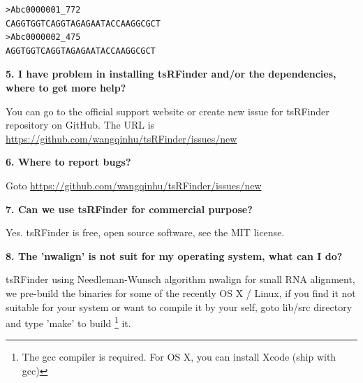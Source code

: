 \documentclass[11pt, a4paper]{article}
\begin{document}
{\tiny \begin{tcolorbox}[colback=blue!5!white,colframe=blue!75!black,title=sRNA example]
\begin{verbatim}
>Abc0000001_772
CAGGTGGTCAGGTAGAGAATACCAAGGCGCT
>Abc0000002_475
AGGTGGTCAGGTAGAGAATACCAAGGCGCT
\end{verbatim}
\end{tcolorbox}}


\textbf{5. I have problem in installing tsRFinder and/or the dependencies, where to get more help?}

You can go to the official support website or create new issue for tsRFinder repository on GitHub. The URL is \url{https://github.com/wangqinhu/tsRFinder/issues/new}

\textbf{6. Where to report bugs?}

Goto \url{https://github.com/wangqinhu/tsRFinder/issues/new}

\textbf{7. Can we use tsRFinder for commercial purpose?}

Yes. tsRFinder is free, open source software, see the MIT license.

\textbf{8. The 'nwalign' is not suit for my operating system, what can I do?}
 
tsRFinder using Needleman-Wunsch algorithm nwalign for small RNA alignment, we pre-build the binaries for some of the recently OS X / Linux, if you find it not suitable for your system or want to compile it by your self, goto lib/src directory and type 'make' to build \footnote{The gcc compiler is required. For OS X, you can install Xcode (ship with gcc)} it.
\end{document}
